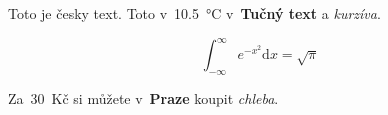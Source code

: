 Toto je česky text. Toto v~10.5~°C v~\textbf{Tučný text} a
\emph{kurzíva}.

\[\int_{-\infty}^{\infty} e^{-x^2} \mathrm{d}x = \sqrt{\pi}\]

Za~30~Kč si můžete v~\textbf{Praze} koupit \emph{chleba}.

